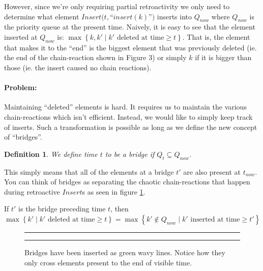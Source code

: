 \documentclass[11pt]{article}
\newtheorem{definition}[theorem]{Definition}
\begin{document}
However, since we're only requiring partial retroactivity we only need to determine what element $Insert(t,$``$insert(k)$''$)$ inserts into $Q_{now}$ where $Q_{now}$ is the priority queue at the present time.  Naively, it is easy to see that the element inserted at $Q_{now}$ is: $\max\left\{k,k' \mid k' \text{ deleted at time} \ge t\right\}$.  That is, the element that makes it to the ``end'' is the biggest element that was previously deleted (ie. the end of the chain-reaction shown in Figure 3) or simply $k$ if it is bigger than those (ie. the insert caused no chain reactions).

\paragraph{Problem:} Maintaining ``deleted'' elements is hard.  It requires us to maintain the various chain-reactions which isn't efficient.  Instead, we would like to simply keep track of inserts.  Such a transformation is possible as long as we define the new concept of ``bridges''.

\begin{definition}
	We define time $t$ to be a bridge if $Q_t \subseteq Q_{now}$.
\end{definition}

This simply means that all of the elements at a bridge $t'$ are also present at $t_{now}$.  You can think of bridges as separating the chaotic chain-reactions that happen during retroactive $Insert$s as seen in figure \ref{fig-pqbridge}.

If $t'$ is the bridge preceding time $t$, then \\ $\max \left\{ k' \mid k' \text{ deleted at time} \ge t \right\} = \max \left\{ k' \notin Q_{now} \mid k' \text{ inserted at time} \ge t' \right\}$


\begin{figure}[ht]
	\rule{\textwidth}{0.005in}
  \begin{center}
  \end{center}

  \caption{\small Bridges have been inserted as green wavy lines. Notice how they only cross elements present to the end of visible time.}
  \label{fig-pqbridge}
	\rule{\textwidth}{0.005in}
\end{figure}
\end{document}
